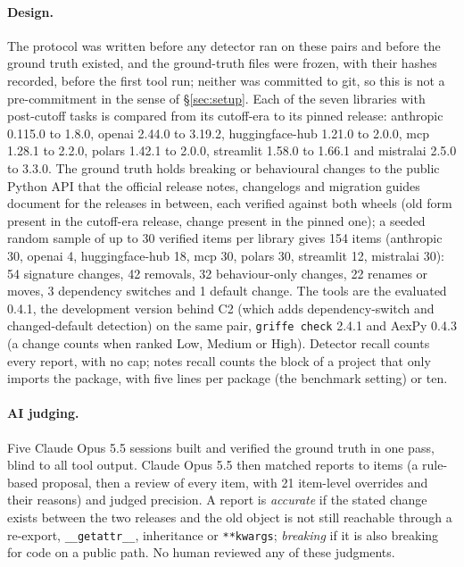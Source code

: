 \documentclass[11pt]{article}
\newcommand{\code}[1]{\texttt{#1}}
\begin{document}
\paragraph{Design.}
The protocol was written before any detector ran on these pairs and before the ground truth existed, and the ground-truth files were frozen, with their hashes recorded, before the first tool run; neither was committed to git, so this is not a pre-commitment in the sense of \S\ref{sec:setup}.
Each of the seven libraries with post-cutoff tasks is compared from its cutoff-era to its pinned release: anthropic 0.115.0 to 1.8.0, openai 2.44.0 to 3.19.2, huggingface-hub 1.21.0 to 2.0.0, mcp 1.28.1 to 2.2.0, polars 1.42.1 to 2.0.0, streamlit 1.58.0 to 1.66.1 and mistralai 2.5.0 to 3.3.0.
The ground truth holds breaking or behavioural changes to the public Python API that the official release notes, changelogs and migration guides document for the releases in between, each verified against both wheels (old form present in the cutoff-era release, change present in the pinned one); a seeded random sample of up to 30 verified items per library gives 154 items (anthropic 30, openai 4, huggingface-hub 18, mcp 30, polars 30, streamlit 12, mistralai 30): 54 signature changes, 42 removals, 32 behaviour-only changes, 22 renames or moves, 3 dependency switches and 1 default change.
The tools are the evaluated 0.4.1, the development version behind C2 (which adds dependency-switch and changed-default detection) on the same pair, \code{griffe check} 2.4.1 and AexPy 0.4.3 (a change counts when ranked Low, Medium or High).
Detector recall counts every report, with no cap; notes recall counts the block of a project that only imports the package, with five lines per package (the benchmark setting) or ten.

\paragraph{AI judging.}
Five Claude Opus 5.5 sessions built and verified the ground truth in one pass, blind to all tool output. Claude Opus 5.5 then matched reports to items (a rule-based proposal, then a review of every item, with 21 item-level overrides and their reasons) and judged precision. A report is \emph{accurate} if the stated change exists between the two releases and the old object is not still reachable through a re-export, \code{\_\_getattr\_\_}, inheritance or \code{**kwargs}; \emph{breaking} if it is also breaking for code on a public path. No human reviewed any of these judgments.
\end{document}
